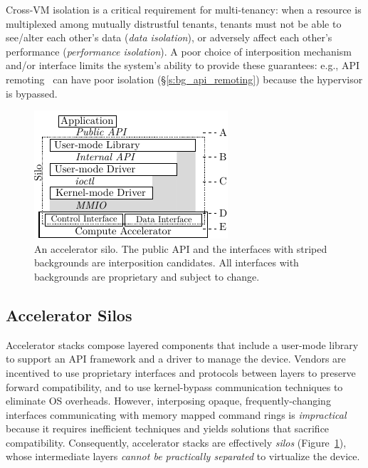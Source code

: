  Cross-VM isolation is a critical requirement for
multi-tenancy:
when a resource is multiplexed among mutually distrustful tenants,
tenants must not be able to see/alter each other's data (\emph{data isolation}),
or adversely affect each other's performance (\emph{performance isolation}).
A poor choice of interposition mechanism and/or interface limits the system's ability to provide these guarantees: e.g., API remoting~\cite{bitfusion, rCUDA, mps}
can have poor isolation (\S\ref{s:bg_api_remoting}) because the hypervisor is bypassed.

\begin{figure}[!t]
	\centering
	\includegraphics[width=.78\linewidth]{ava/images/silo.pdf}
	\caption{An accelerator silo.
		The public API and the interfaces with striped backgrounds are interposition candidates.
		All interfaces with backgrounds are proprietary and subject to change.
        }
	\label{fig:silo}
\end{figure}

\subsection{Accelerator Silos}
\label{s:silo}

Accelerator stacks
compose layered components that include a user-mode library to support an
API framework and a driver to manage the device.
Vendors are incentived to use proprietary interfaces and protocols between layers to preserve forward compatibility,
and to use kernel-bypass communication techniques to eliminate OS overheads.
However, interposing opaque, frequently-changing interfaces communicating with memory
mapped command rings is \emph{impractical} because it requires inefficient techniques and
yields solutions that sacrifice compatibility.
Consequently, accelerator stacks are effectively \emph{silos}
(Figure~\ref{fig:silo}), whose intermediate layers
\emph{cannot be practically separated} to virtualize the device.

